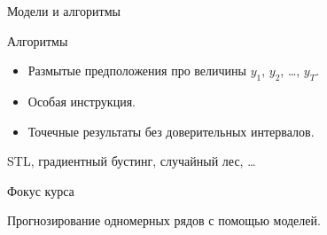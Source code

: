 \begin{frame}{Модели и алгоритмы}

\begin{block}{Алгоритмы}
  \begin{itemize}[<+->]
    \item Размытые предположения про величины $y_1$, $y_2$, \ldots, $y_T$.
    \item Особая инструкция.
    \item Точечные результаты без доверительных интервалов. 
  \end{itemize}
\end{block}
  
\pause
STL, градиентный бустинг, случайный лес, \ldots

\end{frame}

\begin{frame}{Фокус курса}

Прогнозирование одномерных рядов с помощью моделей. 

\end{frame}



